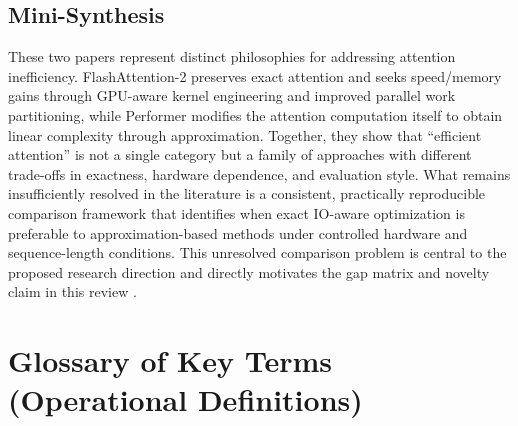 \documentclass[12pt, a4paper]{article}
\begin{document}
\subsection{Mini-Synthesis}

These two papers represent distinct philosophies for addressing attention inefficiency. FlashAttention-2 preserves exact attention and seeks speed/memory gains through GPU-aware kernel engineering and improved parallel work partitioning, while Performer modifies the attention computation itself to obtain linear complexity through approximation. Together, they show that ``efficient attention'' is not a single category but a family of approaches with different trade-offs in exactness, hardware dependence, and evaluation style. What remains insufficiently resolved in the literature is a consistent, practically reproducible comparison framework that identifies when exact IO-aware optimization is preferable to approximation-based methods under controlled hardware and sequence-length conditions. This unresolved comparison problem is central to the proposed research direction and directly motivates the gap matrix and novelty claim in this review \parencite{dao2023flashattention2fasterattentionbetter, choromanski2022rethinkingattentionperformers, tay2020longrangearenabenchmark, zhang2025cabcomprehensiveattentionbenchmarking}.


\section{Glossary of Key Terms (Operational Definitions)}
\end{document}
